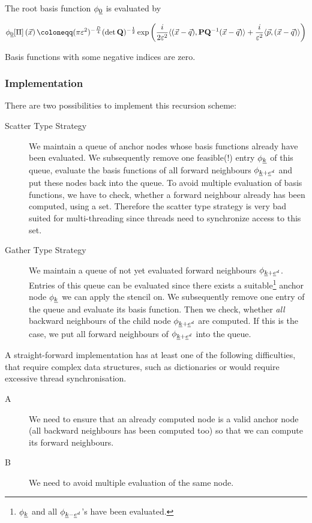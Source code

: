 \documentclass{article}
\begin{document}
The root basis function \(\phi_{\underline{0}}\) is evaluated by

\begin{equation}
  \label{eq:phi0_Dd}
  \phi_{\mindex{0}}[\Pi]\left(\vec{x}\right)
  \coloneqq
  (\pi\varepsilon^2)^{-\frac{D}{4}} (\det\mat{Q})^{-\frac{1}{2}}
  \exp \left( \frac{i}{2\varepsilon^2}
    \dotp{(\vec{x}-\vec{q})}{\mat{P}\mat{Q}^\mathrm{-1}(\vec{x}-\vec{q})}
    + \frac{i}{\varepsilon^2} \dotp{\vec{p}}{(\vec{x}-\vec{q})}
  \right)
\end{equation}

Basis functions with some negative indices are zero.

\subsubsection{Implementation}
There are two possibilities to implement this recursion scheme:
\begin{description}
\item[Scatter Type Strategy] We maintain a queue of anchor nodes whose
  basis functions already have been evaluated.
  We subsequently remove one feasible(!) entry \(\phi_{\underline{k}}\) of this queue,
  evaluate the basis functions of all forward
  neighbours \(\phi_{\underline{k}+\underline{e}^d}\) and put these nodes back into the
  queue. To avoid multiple evaluation of basis functions, we
  have to check, whether a forward neighbour already has been computed,
  using a set. Therefore the scatter type strategy is very bad suited
  for multi-threading since threads need to synchronize access to this
  set.
\item[Gather Type Strategy] We maintain a queue of not yet evaluated
  forward neighbours \(\phi_{\underline{k}+\underline{e}^d}\). Entries of this queue can be evaluated
  since there exists a suitable\footnote{\(\phi_{\underline{k}}\) and all \(\phi_{\underline{k}-\underline{e}^d}\)'s
  have been evaluated.}
  anchor node \(\phi_{\underline{k}}\) we can apply the stencil on.
  We subsequently remove one entry of the queue and evaluate its basis function.
  Then we check, whether \emph{all} backward neighbours of the child
  node \(\phi_{\underline{k}+\underline{e}^d}\) are computed. If this is the case, we put all forward neighbours
  of \(\phi_{\underline{k}+\underline{e}^d}\) into the queue.
\end{description}

A straight-forward implementation has at least one of the following
difficulties, that require complex data structures, such as dictionaries
or would require excessive thread synchronisation.
\begin{description}
\item[A] We need to ensure that an already computed node is a valid
  anchor node (all backward neighbours has been computed too) so that
  we can compute its forward neighbours.
\item[B] We need to avoid multiple evaluation of the same node.
\end{description}
\end{document}
